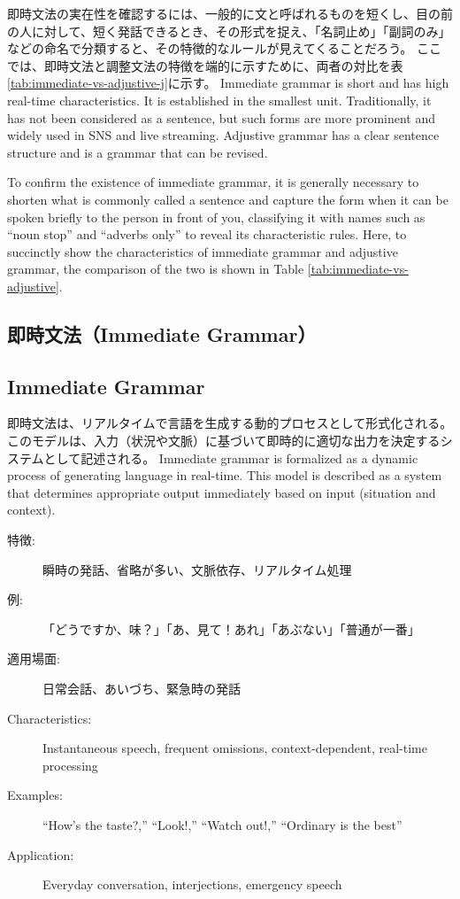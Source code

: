 \documentclass[a4paper]{article}
\begin{document}
即時文法の実在性を確認するには、一般的に文と呼ばれるものを短くし、目の前の人に対して、短く発話できるとき、その形式を捉え、「名詞止め」「副詞のみ」などの命名で分類すると、その特徴的なルールが見えてくることだろう。
ここでは、即時文法と調整文法の特徴を端的に示すために、両者の対比を表\ref{tab:immediate-vs-adjustive-j}に示す。
\else
Immediate grammar is short and has high real-time characteristics. It is established in the smallest unit.
Traditionally, it has not been considered as a sentence, but such forms are more prominent and widely used in SNS and live streaming.
Adjustive grammar has a clear sentence structure and is a grammar that can be revised.

To confirm the existence of immediate grammar, it is generally necessary to shorten what is commonly called a sentence and capture the form when it can be spoken briefly to the person in front of you, classifying it with names such as ``noun stop'' and ``adverbs only'' to reveal its characteristic rules.
Here, to succinctly show the characteristics of immediate grammar and adjustive grammar, the comparison of the two is shown in Table \ref{tab:immediate-vs-adjustive}.
\fi

\ifJPN
  \subsection{即時文法（Immediate Grammar）}
\else
  \subsection{Immediate Grammar}
\fi

\ifJPN
即時文法は、リアルタイムで言語を生成する動的プロセスとして形式化される。このモデルは、入力（状況や文脈）に基づいて即時的に適切な出力を決定するシステムとして記述される。
\else
Immediate grammar is formalized as a dynamic process of generating language in real-time. This model is described as a system that determines appropriate output immediately based on input (situation and context).
\fi

\ifJPN
  \begin{description}
    \item[特徴:] 瞬時の発話、省略が多い、文脈依存、リアルタイム処理
    \item[例:] 「どうですか、味？」「あ、見て！あれ」「あぶない」「普通が一番」
    \item[適用場面:] 日常会話、あいづち、緊急時の発話
  \end{description}
\else
  \begin{description}
    \item[Characteristics:] Instantaneous speech, frequent omissions, context-dependent, real-time processing
    \item[Examples:] ``How's the taste?,'' ``Look!,'' ``Watch out!,'' ``Ordinary is the best''
    \item[Application:] Everyday conversation, interjections, emergency speech
  \end{description}
\fi
\end{document}
